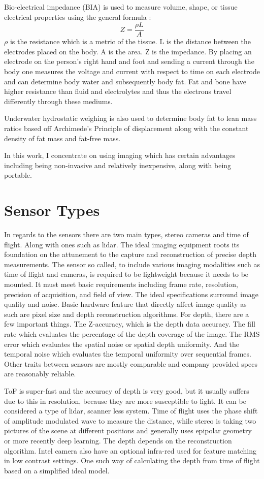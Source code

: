 Bio-electrical impedance (BIA) is used to measure volume, shape, or tissue electrical properties using the general formula \cite{jaffrin2008body}:
\begin{equation}
	Z = \frac{\rho L}{A}
\end{equation}
$\rho$ is the resistance which is a metric of the tissue. L is the distance between the electrodes placed on the body. A is the area. Z is the impedance. By placing an electrode on the person's right hand and foot and sending a current through the body one measures the voltage and current with respect to time on each electrode and can determine body water and subsequently body fat. Fat and bone have higher resistance than fluid and electrolytes and thus the electrons travel differently through these mediums.

Underwater hydrostatic weighing is also used to determine body fat to lean mass ratios based off Archimede's Principle of displacement along with the constant density of fat mass and fat-free mass.

In this work, I concentrate on using imaging which has certain advantages including being non-invasive and relatively inexpensive, along with being portable.
\section{Sensor Types}
In regards to the sensors there are two main types, stereo cameras and time of flight. Along with ones such as lidar. The ideal imaging equipment roots its foundation on the attunement to the capture and reconstruction of precise depth measurements. The sensor so called, to include various imaging
modalities such as time of flight and cameras, is required to be lightweight because it needs to be
mounted. It must meet basic requirements including frame rate, resolution, precision of
acquisition, and field of view. The ideal specifications surround image quality and noise. Basic hardware feature that directly affect image quality as such are pixel size and depth reconstruction algorithms. For depth, there
are a few important things. The Z-accuracy, which is the depth data accuracy. The fill rate which
evaluates the percentage of the depth coverage of the image. The RMS error which evaluates the
spatial noise or spatial depth uniformity. And the temporal noise which evaluates the temporal
uniformity over sequential frames. Other traits between sensors are mostly comparable and
company provided specs are reasonably reliable.

ToF is super-fast and the accuracy of depth is very good, but it usually suffers due to this in resolution, because they are more susceptible to light. It can be considered a type of lidar, scanner less system. Time of flight uses the phase shift of amplitude modulated wave to measure the distance, while stereo is taking two pictures of the scene at different positions and generally uses epipolar geometry or more recently deep learning. The depth depends on the reconstruction algorithm. Intel camera also have an optional infra-red used for feature matching in low contrast settings. One such way of calculating the depth from time of flight based on a simplified ideal model.

